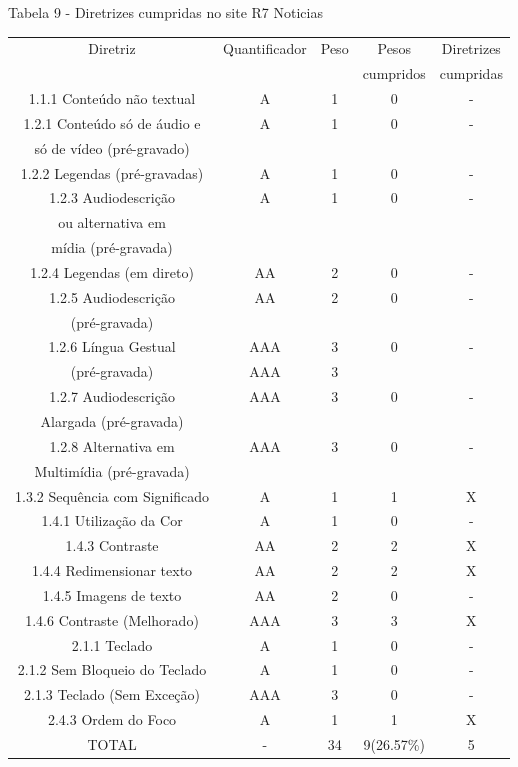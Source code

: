 \documentclass[a4paper]{article}
\begin{document}
\begin{titlepage}
Tabela 9 - Diretrizes cumpridas no site R7 Noticias\\[-1cm]
\begin{center}
	\fontsize{8pt}{8pt}\selectfont	
	\begin{longtable}{|c|c|c|c|c|}
		\hline
		Diretriz & Quantificador & Peso & Pesos & Diretrizes\\
		& & & cumpridos & cumpridas\\
		\hline
		1.1.1 Conteúdo não textual & A & 1 & 0 & - \\
		\hline
		1.2.1 Conteúdo só de áudio e & A & 1 & 0 & - \\
		só de vídeo (pré-gravado) & & & & \\
		\hline
		1.2.2 Legendas (pré-gravadas) & A & 1 & 0 & - \\
		\hline
		1.2.3 Audiodescrição & A & 1 & 0 & - \\
		ou alternativa em & & & & \\
		mídia (pré-gravada) & & & & \\
		\hline
		1.2.4 Legendas (em direto) & AA & 2 & 0 & - \\
		\hline
		1.2.5 Audiodescrição & AA & 2 & 0 & - \\
		(pré-gravada) & & & & \\
		\hline
		1.2.6 Língua Gestual & AAA & 3 & 0 & - \\
		(pré-gravada) & AAA & 3 & & \\
		\hline
		1.2.7 Audiodescrição & AAA & 3 & 0 & - \\
		Alargada (pré-gravada) & & & & \\
		\hline
		1.2.8 Alternativa em & AAA & 3 & 0 & - \\
		Multimídia (pré-gravada) & & & & \\
		\hline
		1.3.2 Sequência com Significado & A & 1 & 1 & X \\
		\hline
		1.4.1 Utilização da Cor & A & 1 & 0 & - \\
		\hline
		1.4.3 Contraste & AA & 2 & 2 & X \\
		\hline
		1.4.4 Redimensionar texto & AA & 2 & 2 & X \\
		\hline
		1.4.5 Imagens de texto & AA & 2 & 0 & - \\
		\hline
		1.4.6 Contraste (Melhorado) & AAA & 3 & 3 & X \\
		\hline
		2.1.1 Teclado & A & 1 & 0 & - \\
		\hline
		2.1.2 Sem Bloqueio do Teclado & A & 1 & 0 & - \\
		\hline
		2.1.3 Teclado (Sem Exceção) & AAA & 3 & 0 & - \\
		\hline
		2.4.3 Ordem do Foco & A & 1 & 1 & X \\
		\hline
		TOTAL & - & 34 & 9(26.57\%) & 5 \\
		\hline
	\end{longtable}
\end{center}


\end{titlepage}
\end{document}
